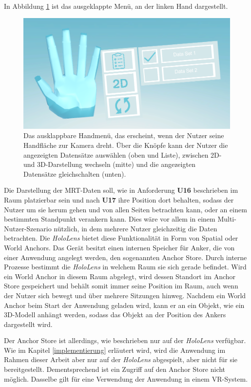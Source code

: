 In Abbildung \ref{img:handUI} ist das ausgeklappte Menü, an der linken Hand dargestellt.

\begin{figure}[!htb]
	\centering
	\includegraphics[width=0.7\linewidth]{images/handUI.png}
	\caption{Das ausklappbare Handmenü, das erscheint, wenn der Nutzer seine Handfläche zur Kamera dreht. Über die Knöpfe kann der Nutzer die angezeigten Datensätze auswählen (oben und Liste), zwischen 2D- und 3D-Darstellung wechseln (mitte) und die angezeigten Datensätze gleichschalten (unten). }
	\label{img:handUI}
\end{figure}
\FloatBarrier


Die Darstellung der MRT-Daten soll, wie in Anforderung \textbf{U16} beschrieben im Raum platzierbar sein und nach \textbf{U17} ihre Position dort behalten, sodass der Nutzer um sie herum gehen und von allen Seiten betrachten kann, oder an einem bestimmten Standpunkt verankern kann. Dies wäre vor allem in einem Multi-Nutzer-Szenario nützlich, in dem mehrere Nutzer gleichzeitig die Daten betrachten.
Die \textit{HoloLens} bietet diese Funktionalität in Form von Spatial oder World Anchors. Das Gerät besitzt einen internen Speicher für Anker, die von einer Anwendung angelegt werden, den sogenannten Anchor Store. Durch interne Prozesse bestimmt die \textit{HoloLens} in welchem Raum sie sich gerade befindet. Wird ein World Anchor in diesem Raum abgelegt, wird dessen Standort im Anchor Store gespeichert und behält somit immer seine Position im Raum, auch wenn der Nutzer sich bewegt und über mehrere Sitzungen hinweg. Nachdem ein World Anchor beim Start der Anwendung geladen wird, kann er an ein Objekt, wie ein 3D-Modell anhängt werden, sodass das Objekt an der Position des Ankers dargestellt wird. 

Der Anchor Store ist allerdings, wie beschrieben nur auf der \textit{HoloLens} verfügbar. Wie im Kapitel \ref{implementierung} erläutert wird, wird die Anwendung im Rahmen dieser Arbeit aber nur auf der \textit{HoloLens} abgespielt, aber nicht für sie bereitgestellt. Dementsprechend ist ein Zugriff auf den Anchor Store nicht möglich. Dasselbe gilt für eine Verwendung der Anwendung in einem VR-System.

